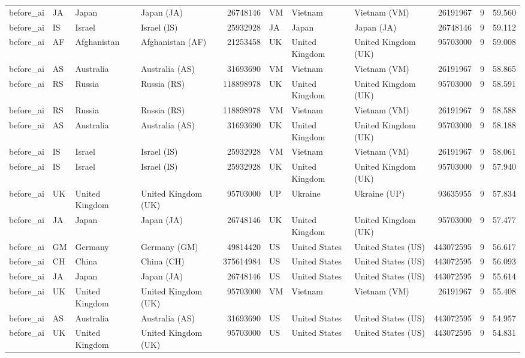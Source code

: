 \begin{tabular}{llllrlllrrr}
before\_ai & JA & Japan & Japan (JA) & 26748146 & VM & Vietnam & Vietnam (VM) & 26191967 & 9 & 59.560 \\
before\_ai & IS & Israel & Israel (IS) & 25932928 & JA & Japan & Japan (JA) & 26748146 & 9 & 59.112 \\
before\_ai & AF & Afghanistan & Afghanistan (AF) & 21253458 & UK & United Kingdom & United Kingdom (UK) & 95703000 & 9 & 59.008 \\
before\_ai & AS & Australia & Australia (AS) & 31693690 & VM & Vietnam & Vietnam (VM) & 26191967 & 9 & 58.865 \\
before\_ai & RS & Russia & Russia (RS) & 118898978 & UK & United Kingdom & United Kingdom (UK) & 95703000 & 9 & 58.591 \\
before\_ai & RS & Russia & Russia (RS) & 118898978 & VM & Vietnam & Vietnam (VM) & 26191967 & 9 & 58.588 \\
before\_ai & AS & Australia & Australia (AS) & 31693690 & UK & United Kingdom & United Kingdom (UK) & 95703000 & 9 & 58.188 \\
before\_ai & IS & Israel & Israel (IS) & 25932928 & VM & Vietnam & Vietnam (VM) & 26191967 & 9 & 58.061 \\
before\_ai & IS & Israel & Israel (IS) & 25932928 & UK & United Kingdom & United Kingdom (UK) & 95703000 & 9 & 57.940 \\
before\_ai & UK & United Kingdom & United Kingdom (UK) & 95703000 & UP & Ukraine & Ukraine (UP) & 93635955 & 9 & 57.834 \\
before\_ai & JA & Japan & Japan (JA) & 26748146 & UK & United Kingdom & United Kingdom (UK) & 95703000 & 9 & 57.477 \\
before\_ai & GM & Germany & Germany (GM) & 49814420 & US & United States & United States (US) & 443072595 & 9 & 56.617 \\
before\_ai & CH & China & China (CH) & 375614984 & US & United States & United States (US) & 443072595 & 9 & 56.093 \\
before\_ai & JA & Japan & Japan (JA) & 26748146 & US & United States & United States (US) & 443072595 & 9 & 55.614 \\
before\_ai & UK & United Kingdom & United Kingdom (UK) & 95703000 & VM & Vietnam & Vietnam (VM) & 26191967 & 9 & 55.408 \\
before\_ai & AS & Australia & Australia (AS) & 31693690 & US & United States & United States (US) & 443072595 & 9 & 54.957 \\
before\_ai & UK & United Kingdom & United Kingdom (UK) & 95703000 & US & United States & United States (US) & 443072595 & 9 & 54.831 \\

\end{tabular}
